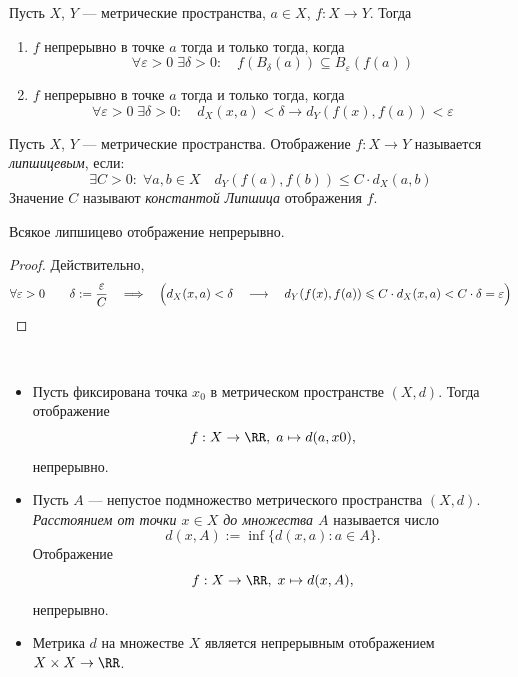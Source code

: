 \documentclass[12pt,a4paper]{article}
\begin{document}
    \begin{corollary}
        Пусть $X$, $Y$ --- метрические пространства, $a \in X$, $f: X \to Y$. Тогда
        \begin{enumerate}
            \item $f$ непрерывно в точке $a$ тогда и только тогда, когда
                \[\forall \varepsilon > 0\; \exists \delta > 0:\quad f(B_\delta(a)) \subseteq B_\varepsilon(f(a))\]
            \item $f$ непрерывно в точке $a$ тогда и только тогда, когда
                \[\forall \varepsilon > 0\; \exists \delta > 0:\quad d_X(x, a) < \delta \rightarrow d_Y(f(x), f(a)) < \varepsilon\]
        \end{enumerate}
    \end{corollary}

    \begin{definition}
        Пусть $X$, $Y$ --- метрические пространства. Отображение $f: X \to Y$ называется \emph{липшицевым}, если:
        \[\exists C > 0:\; \forall a, b \in X\quad d_Y(f(a), f(b)) \leqslant C \cdot d_X(a, b)\]
        Значение $C$ называют \emph{константой Липшица} отображения $f$.
    \end{definition}

    \begin{theorem}
        Всякое липшицево отображение непрерывно.
    \end{theorem}

    \begin{proof}
        Действительно,
        \[\forall \varepsilon > 0\qquad \delta := \frac{\varepsilon}{C}\quad \Longrightarrow\quad \Bigl(d_X(x, a) < \delta\quad \longrightarrow\quad d_Y(f(x), f(a)) \leqslant C \cdot d_X(x, a) < C \cdot \delta = \varepsilon \Bigr)\]
    \end{proof}

    \begin{example}\ 
        \begin{itemize}
            \item Пусть фиксирована точка $x_0$ в метрическом пространстве $(X, d)$. Тогда отображение
                \[f: X \to \RR,\; a \mapsto d(a, x0),\]
                непрерывно.
            \item Пусть $A$ --- непустое подмножество метрического пространства $(X, d)$. \emph{Расстоянием от точки $x \in X$ до множества $A$} называется число
                \[d(x, A) := \inf\{d(x, a): a \in A\}.\]
                Отображение
                \[f: X \to \RR,\; x \mapsto d(x, A),\]
                непрерывно.
            \item Метрика $d$ на множестве $X$ является непрерывным отображением $X \times X \to \RR$.
        \end{itemize}
    \end{example}
\end{document}

